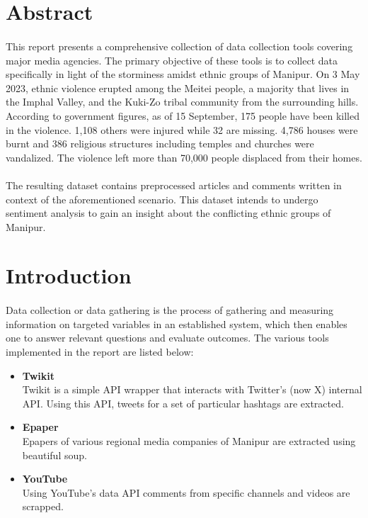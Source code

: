\documentclass{report}
\begin{document}
\newpage
\tableofcontents

\newpage
\vspace*{3pt}
\section{Abstract}
\paragraph{} This report presents a comprehensive collection of data collection tools covering major media agencies. The primary objective of these tools is to collect data specifically in light of the storminess amidst ethnic groups of Manipur. \cite{mv}On 3 May 2023, ethnic violence erupted among the Meitei people, a majority that lives in the Imphal Valley, and the Kuki-Zo tribal community from the surrounding hills. According to government figures, as of 15 September, 175 people have been killed in the violence. 1,108 others were injured while 32 are missing. 4,786 houses were burnt and 386 religious structures including temples and churches were vandalized. The violence left more than 70,000 people displaced from their homes.
\paragraph{}The resulting dataset contains preprocessed articles and comments written in context of the aforementioned scenario. This dataset intends to undergo sentiment analysis to gain an insight about the conflicting ethnic groups of Manipur.



\vspace*{3pt}
\section{Introduction}
\paragraph{} Data collection or data gathering is the process of gathering and measuring information on targeted variables in an established system, which then enables one to answer relevant questions and evaluate outcomes. The various tools implemented in the report are listed below:
\begin{itemize}
    \item \textbf{Twikit}
    \\ Twikit\cite{twi} is a simple API wrapper that interacts with Twitter's (now X) internal API. Using this API, tweets for a set of particular hashtags are extracted.
    \item \textbf{Epaper}
    \\ Epapers of various regional media companies of Manipur are extracted using beautiful soup\cite{bs}.
    \item \textbf{YouTube}
    \\ Using YouTube's data API\cite{yt} comments from specific channels and videos are scrapped.
\end{itemize}
\end{document}
